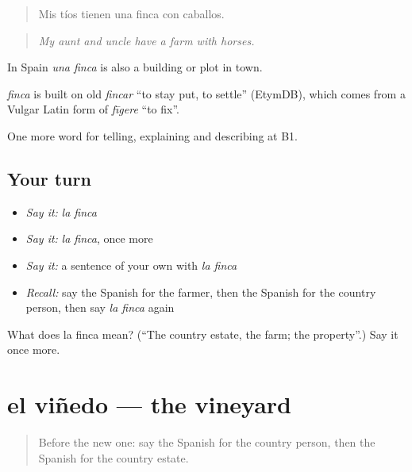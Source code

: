 \begin{quote}
Mis tíos tienen una finca con caballos.
\end{quote}

\begin{quote}
\emph{My aunt and uncle have a farm with horses.}
\end{quote}

In Spain \emph{una finca} is also a building or plot in town.

\begin{cousinweb}
\emph{finca} is built on old \emph{fincar} \textquotedblleft{}to stay put, to settle\textquotedblright{} (EtymDB), which comes from a Vulgar Latin form of \emph{fīgere} \textquotedblleft{}to fix\textquotedblright{}.
\end{cousinweb}

\begin{grammarlens}[title={What you've built}]
One more word for telling, explaining and describing at B1.
\end{grammarlens}

\subsection*{Your turn}
\begin{itemize}
\raggedright
  \item \emph{Say it:} \emph{la finca}
  \item \emph{Say it:} \emph{la finca}, once more
  \item \emph{Say it:} a sentence of your own with \emph{la finca}
  \item \emph{Recall:} say the Spanish for the farmer, then the Spanish for the country person, then say \emph{la finca} again
\end{itemize}

\begin{tcolorbox}[breakable,colback=teal!4,colframe=teal!35!black,title={Before you move on}]
What does la finca mean? (\textquotedblleft{}The country estate, the farm; the property\textquotedblright{}.) Say it once more.
\end{tcolorbox}
\section[el viñedo]{el viñedo — the vineyard}

\label{lesson:ES-C691-vinedo}



\begin{quote}
Before the new one: say the Spanish for the country person, then the Spanish for the country estate.
\end{quote}

